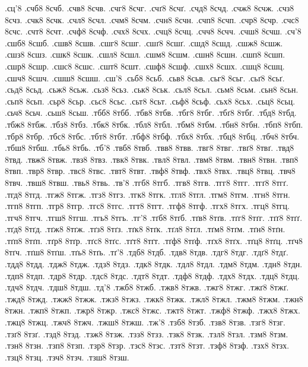 {.сц'8
.счб8
8счб.
.счв8
8счв.
.счг8
8счг.
.счґ8
8счґ.
.счд8
8счд.
.счж8
8счж.
.счз8
8счз.
.счк8
8счк.
.счл8
8счл.
.счм8
8счм.
.счн8
8счн.
.счп8
8счп.
.счр8
8счр.
.счс8
8счс.
.счт8
8счт.
.счф8
8счф.
.счх8
8счх.
.счц8
8счц.
.счч8
8счч.
.счш8
8счш.
.сч'8
.сшб8
8сшб.
.сшв8
8сшв.
.сшг8
8сшг.
.сшґ8
8сшґ.
.сшд8
8сшд.
.сшж8
8сшж.
.сшз8
8сшз.
.сшк8
8сшк.
.сшл8
8сшл.
.сшм8
8сшм.
.сшн8
8сшн.
.сшп8
8сшп.
.сшр8
8сшр.
.сшс8
8сшс.
.сшт8
8сшт.
.сшф8
8сшф.
.сшх8
8сшх.
.сшц8
8сшц.
.сшч8
8сшч.
.сшш8
8сшш.
.сш'8
.сьб8
8сьб.
.сьв8
8сьв.
.сьг8
8сьг.
.сьґ8
8сьґ.
.сьд8
8сьд.
.сьж8
8сьж.
.сьз8
8сьз.
.ськ8
8ськ.
.сьл8
8сьл.
.сьм8
8сьм.
.сьн8
8сьн.
.сьп8
8сьп.
.сьр8
8сьр.
.сьс8
8сьс.
.сьт8
8сьт.
.сьф8
8сьф.
.сьх8
8сьх.
.сьц8
8сьц.
.сьч8
8сьч.
.сьш8
8сьш.
.тбб8
8тбб.
.тбв8
8тбв.
.тбг8
8тбг.
.тбґ8
8тбґ.
.тбд8
8тбд.
.тбж8
8тбж.
.тбз8
8тбз.
.тбк8
8тбк.
.тбл8
8тбл.
.тбм8
8тбм.
.тбн8
8тбн.
.тбп8
8тбп.
.тбр8
8тбр.
.тбс8
8тбс.
.тбт8
8тбт.
.тбф8
8тбф.
.тбх8
8тбх.
.тбц8
8тбц.
.тбч8
8тбч.
.тбш8
8тбш.
.тбь8
8тбь.
.тб'8
.твб8
8твб.
.твв8
8твв.
.твг8
8твг.
.твґ8
8твґ.
.твд8
8твд.
.твж8
8твж.
.твз8
8твз.
.твк8
8твк.
.твл8
8твл.
.твм8
8твм.
.твн8
8твн.
.твп8
8твп.
.твр8
8твр.
.твс8
8твс.
.твт8
8твт.
.твф8
8твф.
.твх8
8твх.
.твц8
8твц.
.твч8
8твч.
.твш8
8твш.
.твь8
8твь.
.тв'8
.тгб8
8тгб.
.тгв8
8тгв.
.тгг8
8тгг.
.тгґ8
8тгґ.
.тгд8
8тгд.
.тгж8
8тгж.
.тгз8
8тгз.
.тгк8
8тгк.
.тгл8
8тгл.
.тгм8
8тгм.
.тгн8
8тгн.
.тгп8
8тгп.
.тгр8
8тгр.
.тгс8
8тгс.
.тгт8
8тгт.
.тгф8
8тгф.
.тгх8
8тгх.
.тгц8
8тгц.
.тгч8
8тгч.
.тгш8
8тгш.
.тгь8
8тгь.
.тг'8
.тґб8
8тґб.
.тґв8
8тґв.
.тґг8
8тґг.
.тґґ8
8тґґ.
.тґд8
8тґд.
.тґж8
8тґж.
.тґз8
8тґз.
.тґк8
8тґк.
.тґл8
8тґл.
.тґм8
8тґм.
.тґн8
8тґн.
.тґп8
8тґп.
.тґр8
8тґр.
.тґс8
8тґс.
.тґт8
8тґт.
.тґф8
8тґф.
.тґх8
8тґх.
.тґц8
8тґц.
.тґч8
8тґч.
.тґш8
8тґш.
.тґь8
8тґь.
.тґ'8
.тдб8
8тдб.
.тдв8
8тдв.
.тдг8
8тдг.
.тдґ8
8тдґ.
.тдд8
8тдд.
.тдж8
8тдж.
.тдз8
8тдз.
.тдк8
8тдк.
.тдл8
8тдл.
.тдм8
8тдм.
.тдн8
8тдн.
.тдп8
8тдп.
.тдр8
8тдр.
.тдс8
8тдс.
.тдт8
8тдт.
.тдф8
8тдф.
.тдх8
8тдх.
.тдц8
8тдц.
.тдч8
8тдч.
.тдш8
8тдш.
.тд'8
.тжб8
8тжб.
.тжв8
8тжв.
.тжг8
8тжг.
.тжґ8
8тжґ.
.тжд8
8тжд.
.тжж8
8тжж.
.тжз8
8тжз.
.тжк8
8тжк.
.тжл8
8тжл.
.тжм8
8тжм.
.тжн8
8тжн.
.тжп8
8тжп.
.тжр8
8тжр.
.тжс8
8тжс.
.тжт8
8тжт.
.тжф8
8тжф.
.тжх8
8тжх.
.тжц8
8тжц.
.тжч8
8тжч.
.тжш8
8тжш.
.тж'8
.тзб8
8тзб.
.тзв8
8тзв.
.тзг8
8тзг.
.тзґ8
8тзґ.
.тзд8
8тзд.
.тзж8
8тзж.
.тзз8
8тзз.
.тзк8
8тзк.
.тзл8
8тзл.
.тзм8
8тзм.
.тзн8
8тзн.
.тзп8
8тзп.
.тзр8
8тзр.
.тзс8
8тзс.
.тзт8
8тзт.
.тзф8
8тзф.
.тзх8
8тзх.
.тзц8
8тзц.
.тзч8
8тзч.
.тзш8
8тзш.
}

